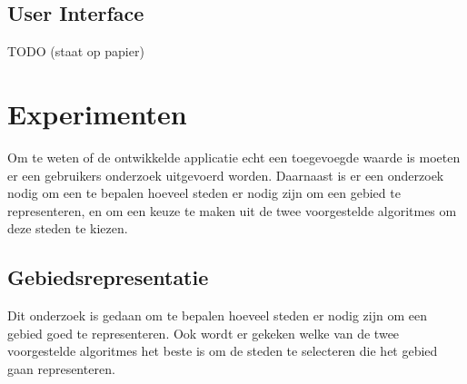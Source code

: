 \documentclass[twoside,openright]{uva-bachelor-thesis}
\begin{document}
		\section{User Interface}
		TODO (staat op papier)
\chapter{Experimenten}
	Om te weten of de ontwikkelde applicatie echt een toegevoegde waarde is moeten er een gebruikers onderzoek uitgevoerd worden. Daarnaast is er een onderzoek nodig om een te bepalen hoeveel steden er nodig zijn om een gebied te representeren, en om een keuze te maken uit de twee voorgestelde algoritmes om deze steden te kiezen.
	\section{Gebiedsrepresentatie}
	\label{sec:numcities}
		Dit onderzoek is gedaan om te bepalen hoeveel steden er nodig zijn om een gebied goed te representeren. Ook wordt er gekeken welke van de twee voorgestelde algoritmes het beste is om de steden te selecteren die het gebied gaan representeren.
\end{document}
